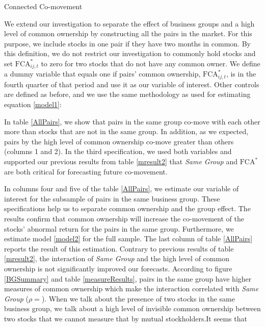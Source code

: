 \documentclass[12pt, a4paper]{article}
\begin{document}
\begin{table}[htbp]
\centering
\caption{Connected Co-movement}
\label{mresult2}
    \resizebox{1\textwidth}{!}{

}
\end{table}


We extend our investigation to separate the effect of business groups and a high level of common ownership by constructing all the pairs in the market. For this purpose, we include stocks in one pair if they have two months in common. By this definition, we do not restrict our investigation to commonly hold stocks and set $\text{FCA}^*_{ij,t}$ to zero for two stocks that do not have any common owner. We define a dummy variable that equals one if pairs' common ownership, $\text{FCA}^*_{ij,t}$, is in the fourth quarter of that period and use it as our variable of interest. Other controls are defined as before, and we use the same methodology as used for estimating equation \ref{model1}:


In table \ref{AllPairs}, we show that pairs in the same group co-move with each other more than stocks that are not in the same group. In addition, as we expected, pairs by the high level of common ownership co-move greater than others (columns 1 and 2). In the third specification, we used both variables and supported our previous results from table \ref{mresult2} that \textit{Same Group} and $\text{FCA}^*$ are both critical for forecasting future co-movement. 

In columns four and five of the table \ref{AllPairs},  we estimate our variable of interest for the subsample of pairs in the same business group. These specifications help us to separate common ownership and the group effect. The results confirm that common ownership will increase the co-movement of the stocks' abnormal return for the pairs in the same group. Furthermore, we estimate model \ref{model2} for the full sample. The last column of table \ref{AllPairs} reports the result of this estimation. Contrary to previous results of table \ref{mresult2}, the interaction of \textit{Same Group} and the high level of common ownership is not significantly improved our forecasts. According to figure \ref{BGSummary} and table \ref{measureResults}, pairs in the same group have higher measures of common ownership which make the interaction correlated with \textit{Same Group} ($ \rho =  $). When we talk about the presence of two stocks in the same business group, we talk about a high level of invisible common ownership between two stocks that we cannot measure that by mutual stockholders.It seems that 
\end{document}
